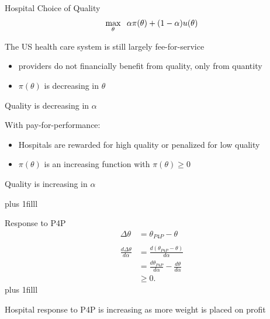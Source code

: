 \documentclass[notes,11pt, aspectratio=169]{beamer}
\newcommand{\btVFill}{\vskip0pt plus 1filll}
\begin{document}
\begin{frame}[noframenumbering]{Hospital Choice of Quality}
\vspace{5mm}
$$\max_{\theta}\hspace{2mm}\alpha\pi(\theta) + (1-\alpha) u(\theta)$$

    \vspace{3mm}

The US health care system is still largely fee-for-service
\begin{itemize}
    \item providers do not financially benefit from quality, only from quantity
    \item $\pi(\theta)$ is decreasing in $\theta$
\end{itemize}
    \begin{block}{}
        Quality is decreasing in $\alpha$ 
    \end{block}

\vspace{3mm}\pause

With pay-for-performance:
\begin{itemize}
    \item Hospitals are rewarded for high quality or penalized for low quality
    \item $\pi(\theta)$ is an increasing function with $\pi(\theta)\geq 0$
\end{itemize}
    \begin{block}{}
        Quality is increasing in $\alpha$ 
    \end{block}


    \btVFill
\end{frame}


\begin{frame}{Response to P4P}
\vspace{10mm}
    \begin{align*}
        \Delta\theta &= \theta_{P4P}-\theta\\
        \\
        \frac{d\Delta\theta}{d\alpha}&=\frac{d(\theta_{P4P}-\theta)}{d\alpha}\\
        &=\frac{d\theta_{P4P}}{d\alpha}-\frac{d\theta}{d\alpha}\\
        &\geq 0.
    \end{align*}
    \btVFill\pause

    \begin{block}{}
    Hospital response to P4P is increasing as more weight is placed on profit
    \end{block}
\end{frame}
\end{document}
